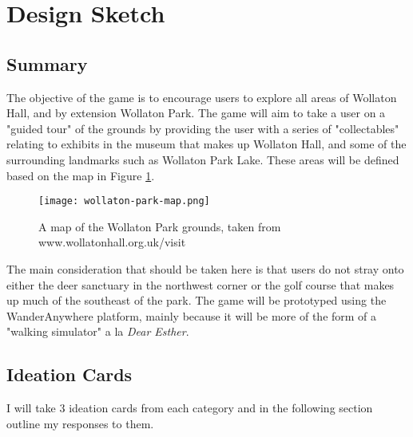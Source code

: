 \documentclass[12pt, a4paper]{article}
\begin{document}
\maketitle

\section{Design Sketch}
\subsection{Summary}
The objective of the game is to encourage users to explore all areas of Wollaton Hall, and by extension Wollaton Park.
The game will aim to take a user on a "guided tour" of the grounds by providing the user with a series of "collectables" relating to exhibits in the museum that makes up Wollaton Hall, and some of the surrounding landmarks such as Wollaton Park Lake.
These areas will be defined based on the map in Figure \ref{fig:wollatonmap}.

\begin{figure}[ht]
  \centering
  \caption{A map of the Wollaton Park grounds, taken from www.wollatonhall.org.uk/visit}
  \texttt{[image: wollaton-park-map.png]}
  \label{fig:wollatonmap}
\end{figure}

The main consideration that should be taken here is that users do not stray onto either the deer sanctuary in the northwest corner or the golf course that makes up much of the southeast of the park.
The game will be prototyped using the WanderAnywhere platform, mainly because it will be more of the form of a "walking simulator" a la \textit{Dear Esther}.

\subsection{Ideation Cards}
I will take 3 ideation cards from each category and in the following section outline my responses to them.
\end{document}
